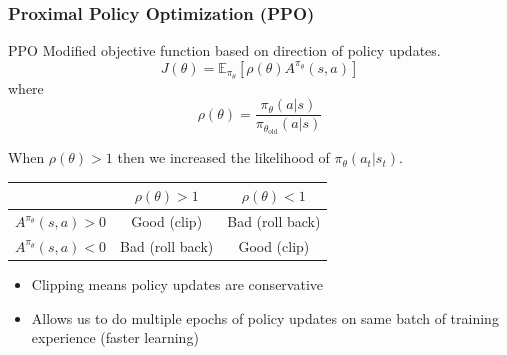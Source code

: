 \documentclass{beamer}
\begin{document}
\begin{frame}
  \frametitle{Proximal Policy Optimization (PPO)}
  \begin{alertblock}{PPO}
    Modified objective function based on direction of policy updates.
    \begin{equation*}
      J(\theta) = \mathbb{E}_{\pi_\theta} \left[ \rho(\theta) A^{\pi_\theta}(s, a) \right]
    \end{equation*}
    where
    \begin{equation*}
      \rho(\theta) = \frac{\pi_\theta (a \vert s)}{\pi_{\theta_\text{old}} (a \vert s)}
    \end{equation*}
  \end{alertblock}
  When $\rho(\theta) > 1$ then we increased the likelihood of $\pi_\theta(a_t \vert s_t)$.
  \begin{table}
  \begin{tabular}{|c|cc|}
    \hline
    & $\rho(\theta) > 1$ & $\rho(\theta) < 1$ \\ \hline
    $A^{\pi_\theta}(s, a) > 0$ & Good (clip) & Bad (roll back) \\
    $A^{\pi_\theta}(s, a) < 0$ & Bad (roll back) & Good (clip) \\ \hline
  \end{tabular}
\end{table}
\begin{itemize}
  \item Clipping means policy updates are conservative
  \item Allows us to do multiple epochs of policy updates on same batch of training experience (faster learning)
\end{itemize}
\end{frame}
\end{document}
